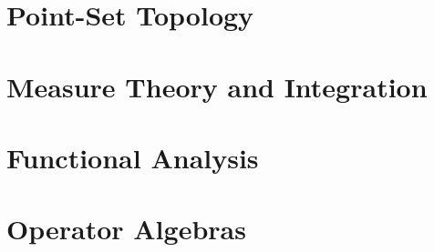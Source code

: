 \documentclass[10pt]{package2}
\begin{document}
\chapter{Point-Set Topology}\label{ch:point_set_topology}

\chapter{Measure Theory and Integration}\label{ch:measure_theory}

\chapter{Functional Analysis}\label{ch:functional_analysis}

\chapter{Operator Algebras}\label{ch:operator_algebras}

\nocite{*}
\printbibliography[heading=bibintoc,title={References}]
\end{document}
